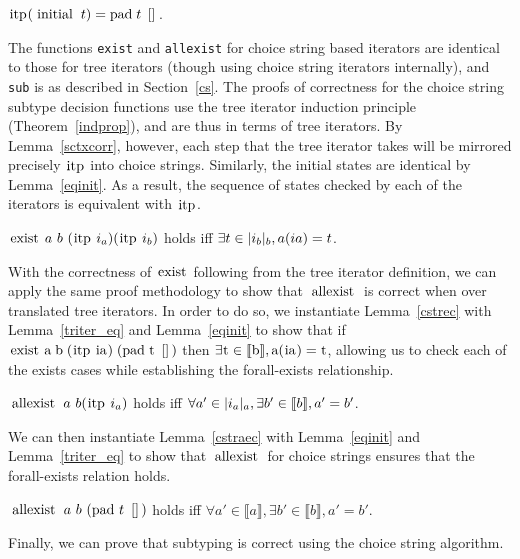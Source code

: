 \documentclass[a4paper,english]{lipics-v2019}
\newcommand{\denotes}[1]{\llbracket #1 \rrbracket}
\renewcommand{\c}[1]{\ensuremath{\text{\lstinline{#1}}}\xspace}
\begin{document}
\begin{lemma}\label{eqinit}
$\c{itp} (\c{initial}\;t) = \c{pad}\;t\;\c{[]}$.
\end{lemma}

\noindent
The functions \verb|exist| and \verb|allexist| for choice string based
iterators are identical to those for tree iterators (though using choice
string iterators internally), and \verb|sub| is as described in
Section~\ref{cs}. The proofs of correctness for the choice string subtype
decision functions use the tree iterator induction principle
(Theorem~\ref{indprop}), and are thus in terms of tree iterators. By
Lemma~\ref{sctxcorr}, however, each step that the tree iterator takes will be
mirrored precisely \c{itp} into choice strings. Similarly, the initial states
are identical by Lemma~\ref{eqinit}. As a result, the sequence of states
checked by each of the iterators is equivalent with \c{itp}.

\begin{lemma}\label{cstrec}
$\c{exist}~a~b~(\c{itp}~i_a) (\c{itp}~i_b)$ holds iff $\exists t \in
  |i_b|_{b}, a(ia)=t$.
\end{lemma}

With the correctness of \c{exist} following from the tree iterator definition,
we can apply the same proof methodology to show that \c{allexist} is correct
when over translated tree iterators. In order to do so, we instantiate
Lemma~\ref{cstrec}  with Lemma~\ref{triter_eq} and Lemma~\ref{eqinit} to show
that if $\c{exist}\;\c a\;\c b\;(\c{itp}\;\c{ia})\;(\c{pad}\;\c t\;\c{[]})$
then $\exists \c t \in \denotes{\c b}, \c a(\c{ia}) = \c t$, allowing us to check 
each of the exists cases while establishing the forall-exists relationship.

\begin{lemma}\label{cstraec}
$\c{allexist}~a~b (\c{itp}~i_a)$
 holds iff $\forall a'\in\irch{i_a}{a}, \exists b'\in\denotes{b},a'=b'$.
\end{lemma}

\noindent We can then instantiate Lemma~\ref{cstraec} with
Lemma~\ref{eqinit} and Lemma~\ref{triter_eq} to show that \c{allexist} for
choice strings ensures that the forall-exists relation holds.
 
\begin{theorem}
$\c{allexist}~a~b~(\c{pad}~t~\c{[]})$
 holds iff $\forall a'\in\denotes{a},\exists b'\in\denotes{b}, a'=b'$.
\end{theorem}

\noindent Finally, we can prove that subtyping is correct using the choice
string algorithm.
\end{document}
